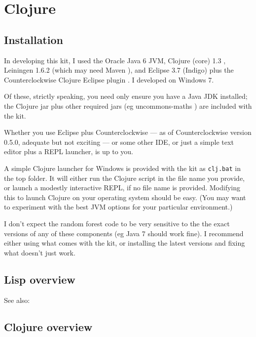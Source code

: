 \documentclass[10pt,openany]{article}
\numberwithin{definition}{section}
\numberwithin{example}{section}
\numberwithin{equation}{section}
\numberwithin{figure}{section}
\begin{document}
\appendix



\section{\label{sec:Clojure}Clojure}


\subsection{Installation}

In developing this kit, I used the Oracle Java 6 JVM\cite{java6-2012},
Clojure (core) 1.3 \cite{clojure-2012}, Leiningen 1.6.2\cite{leinigen-2012}
(which may need Maven \cite{maven-2012}), and Eclipse 3.7 (Indigo)
plus the Counterclockwise Clojure Eclipse plugin \cite{counterclockwise-2012}.
I developed on Windows 7.

Of these, strictly speaking, you need only ensure you have a Java
JDK installed; the Clojure jar plus other required jars (eg uncommons-maths
\cite{uncommons-maths-2012}) are included with the kit. 

Whether you use Eclipse plus Counterclockwise --- as of Counterclockwise
version 0.5.0, adequate but not exciting --- or some other IDE, or
just a simple text editor plus a REPL launcher, is up to you. 

A simple Clojure launcher for Windows is provided with the kit as
\texttt{clj.bat} in the top folder. It will either run the Clojure
script in the file name you provide, or launch a modestly interactive
REPL, if no file name is provided. Modifying this to launch Clojure
on your operating system should be easy. (You may want to experiment
with the best JVM options for your particular environment.)

I don't expect the random forest code to be very sensitive to the
the exact versions of any of these components (eg Java 7 should work
fine). I recommend either using what comes with the kit, or installing
the latest versions and fixing what doesn't just work.


\subsection{Lisp overview}

See also: \cite{steele-cltl2-1990,kiczales-metaobject-protocol-1991,dylan1992,norvig1992paradigms,abelson1996sicp}


\subsection{Clojure overview}
\end{document}
